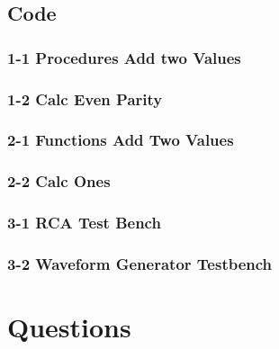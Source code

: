 \documentclass[a4paper, 12pt]{article}
\begin{document}
		\subsection{Code}
			\subsubsection{1-1 Procedures Add two Values}
				
				
			\subsubsection{1-2 Calc Even Parity}
				
				
			\subsubsection{2-1 Functions Add Two Values}
				
				
			\subsubsection{2-2 Calc Ones}
				
				
			\subsubsection{3-1 RCA Test Bench}
				
			\subsubsection{3-2 Waveform Generator Testbench}
				




	\section{Questions}



\end{document}
